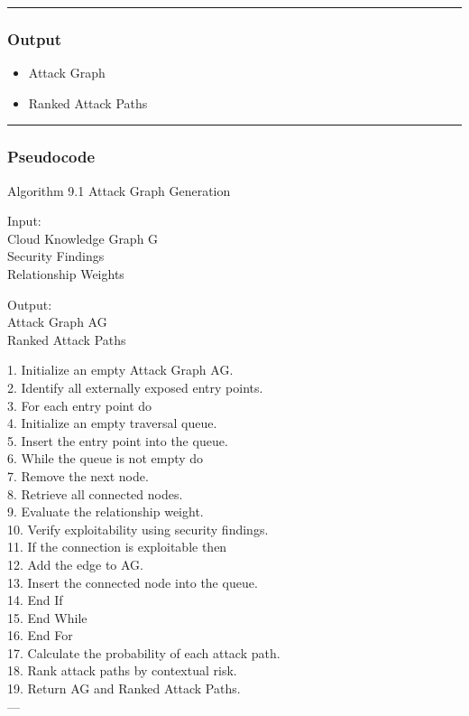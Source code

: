 \begin{center}\rule{0.5\linewidth}{0.5pt}\end{center}

\subsubsection{\texorpdfstring{\textbf{Output}}{Output}}

\begin{itemize}
\tightlist
\item
  Attack Graph\\
\item
  Ranked Attack Paths
\end{itemize}

\begin{center}\rule{0.5\linewidth}{0.5pt}\end{center}

\subsubsection{Pseudocode}

Algorithm 9.1 Attack Graph Generation

Input:\\
Cloud Knowledge Graph G\\
Security Findings\\
Relationship Weights

Output:\\
Attack Graph AG\\
Ranked Attack Paths

1. Initialize an empty Attack Graph AG.\\
2. Identify all externally exposed entry points.\\
3. For each entry point do\\
4. Initialize an empty traversal queue.\\
5. Insert the entry point into the queue.\\
6. While the queue is not empty do\\
7. Remove the next node.\\
8. Retrieve all connected nodes.\\
9. Evaluate the relationship weight.\\
10. Verify exploitability using security findings.\\
11. If the connection is exploitable then\\
12. Add the edge to AG.\\
13. Insert the connected node into the queue.\\
14. End If\\
15. End While\\
16. End For\\
17. Calculate the probability of each attack path.\\
18. Rank attack paths by contextual risk.\\
19. Return AG and Ranked Attack Paths.\\
---

